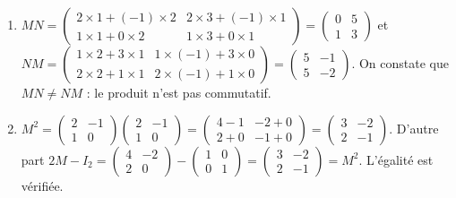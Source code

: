 \documentclass[11pt]{article}
\begin{document}
\begin{corrige}[Exercice 1]
\begin{enumerate}
\item $MN = \begin{pmatrix} 2\times 1 + (-1)\times 2 & 2\times 3 + (-1)\times 1 \\ 1\times 1 + 0\times 2 & 1\times 3 + 0\times 1 \end{pmatrix} = \begin{pmatrix} 0 & 5 \\ 1 & 3 \end{pmatrix}$ et $NM = \begin{pmatrix} 1\times 2 + 3\times 1 & 1\times(-1) + 3\times 0 \\ 2\times 2 + 1\times 1 & 2\times(-1) + 1\times 0 \end{pmatrix} = \begin{pmatrix} 5 & -1 \\ 5 & -2 \end{pmatrix}$. On constate que $MN \neq NM$ : le produit n'est pas commutatif.
\item $M^2 = \begin{pmatrix} 2 & -1 \\ 1 & 0 \end{pmatrix}\begin{pmatrix} 2 & -1 \\ 1 & 0 \end{pmatrix} = \begin{pmatrix} 4-1 & -2+0 \\ 2+0 & -1+0 \end{pmatrix} = \begin{pmatrix} 3 & -2 \\ 2 & -1 \end{pmatrix}$. D'autre part $2M - I_2 = \begin{pmatrix} 4 & -2 \\ 2 & 0 \end{pmatrix} - \begin{pmatrix} 1 & 0 \\ 0 & 1 \end{pmatrix} = \begin{pmatrix} 3 & -2 \\ 2 & -1 \end{pmatrix} = M^2$. L'égalité est vérifiée.

\end{enumerate}
\end{corrige}
\end{document}
